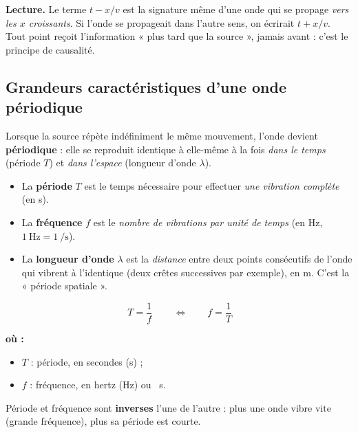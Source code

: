 \documentclass[11pt,a4paper]{article}
\newenvironment{ou}{%
  \par\smallskip\noindent\textbf{où :}\nopagebreak
  \begin{itemize}[leftmargin=1.8em,topsep=2pt,itemsep=1.5pt,parsep=0pt]}%
  {\end{itemize}}
\begin{document}
\noindent\textbf{Lecture.} Le terme $t - x/v$ est la signature même d'une onde qui se propage
\emph{vers les $x$ croissants}. Si l'onde se propageait dans l'autre sens, on écrirait
$t + x/v$. Tout point reçoit l'information « plus tard que la source », jamais avant : c'est le
principe de causalité.

\subsection{Grandeurs caractéristiques d'une onde périodique}

Lorsque la source répète indéfiniment le même mouvement, l'onde devient \textbf{périodique} :
elle se reproduit identique à elle-même à la fois \emph{dans le temps} (période $T$) et
\emph{dans l'espace} (longueur d'onde $\lambda$).

\begin{definition}
\begin{itemize}[leftmargin=1.5em,topsep=2pt,itemsep=2pt]
  \item La \textbf{période} $T$ est le temps nécessaire pour effectuer \emph{une vibration
        complète} (en \si{\second}).
  \item La \textbf{fréquence} $f$ est le \emph{nombre de vibrations par unité de temps}
        (en \si{\hertz}, $\SI{1}{\hertz} = \SI{1}{\per\second}$).
  \item La \textbf{longueur d'onde} $\lambda$ est la \emph{distance} entre deux points
        consécutifs de l'onde qui vibrent à l'identique (deux crêtes successives par
        exemple), en \si{\metre}. C'est la « période spatiale ».
\end{itemize}
\end{definition}

\begin{formule}
\[ \boxed{\,T = \dfrac{1}{f}\,}\qquad\Longleftrightarrow\qquad f = \dfrac{1}{T} \]
\begin{ou}
  \item $T$ : période, en secondes (\si{\second}) ;
  \item $f$ : fréquence, en hertz (\si{\hertz}) ou \si{\per\second}.
\end{ou}
Période et fréquence sont \textbf{inverses} l'une de l'autre : plus une onde vibre vite
(grande fréquence), plus sa période est courte.
\end{formule}
\end{document}

